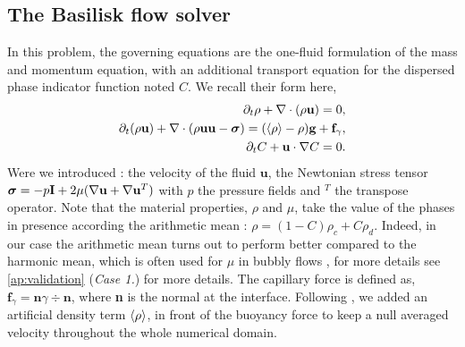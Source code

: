 \subsection{The Basilisk flow solver}


In this problem, the governing equations are the one-fluid formulation of the mass and momentum equation, with an additional transport equation for the dispersed phase indicator function noted $C$. 
We recall their form here, 
\begin{align}
    \partial_t \rho+ \mathbf{\nabla}\cdot(\rho\textbf{u})
    = 0,\\
    \partial_t (\rho \textbf{u})
    + \mathbf{\nabla}\cdot (\rho  \textbf{u} \textbf{u} - \bm\sigma)
    = (\left<\rho\right> - \rho)\textbf{g}
    + \textbf{f}_\gamma,\\
    \partial_t C + \textbf{u}\cdot\mathbf{\nabla} C = 0.
\end{align}
Were we introduced : the velocity of the fluid $\textbf{u}$,  the Newtonian stress  tensor $\bm{\sigma} = -p \textbf{I} + 2\mu (\mathbf{\nabla} \textbf{u}+\mathbf{\nabla} \textbf{u}^T)$ with $p$ the pressure fields and $^T$ the transpose operator.
Note that the material properties, $\rho$ and $\mu$, take the value of the phases in presence according the arithmetic mean : $\rho = (1-C)\rho_c + C \rho_d$. 
Indeed, in our case the arithmetic mean turns out to perform better compared to the harmonic mean, which is often used for $\mu$ in bubbly flows \citet{hidman2023assessing,innocenti2020direct}, for more details see \ref{ap:validation} (\textit{Case 1.}) for more details. 
The capillary force is defined as, $\textbf{f}_\gamma =\textbf{n} \gamma \div \textbf{n} $, where \textbf{n} is the normal at the interface.
Following  \citep{bunner2002dynamics}, we added an artificial density term $\left<\rho\right>$, in front of the buoyancy force to keep a null averaged velocity throughout the whole numerical domain.  

